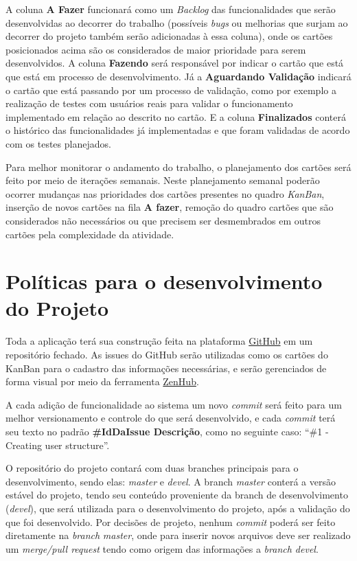 A coluna \textbf{A Fazer} funcionará como um \textit{Backlog} das funcionalidades que serão desenvolvidas ao decorrer do trabalho (possíveis \textit{bugs} ou melhorias que surjam ao decorrer do projeto também serão adicionadas à essa coluna), onde os cartões posicionados acima são os considerados de maior prioridade para serem desenvolvidos. A coluna \textbf{Fazendo} será responsável por indicar o cartão que está que está em processo de desenvolvimento. Já a \textbf{Aguardando Validação} indicará o cartão que está passando por um processo de validação, como por exemplo a realização de testes com usuários reais para validar o funcionamento implementado em relação ao descrito no cartão. E a coluna \textbf{Finalizados} conterá o histórico das funcionalidades já implementadas e que foram validadas de acordo com os testes planejados.

Para melhor monitorar o andamento do trabalho, o planejamento dos cartões será feito por meio de iterações semanais. Neste planejamento semanal poderão ocorrer mudanças nas prioridades dos cartões presentes no quadro \textit{KanBan}, inserção de novos cartões na fila \textbf{A fazer}, remoção do quadro cartões que são considerados não necessários ou que precisem ser desmembrados em outros cartões pela complexidade da atividade. 

\section{Políticas para o desenvolvimento do Projeto}

Toda a aplicação terá sua construção feita na plataforma \href{https://github.com/}{GitHub}
em um repositório fechado. As issues do GitHub serão utilizadas como os cartões do KanBan para o cadastro das informações necessárias, e serão gerenciados de forma visual por meio da ferramenta \href{https://www.zenhub.com/}{ZenHub}.
 
A cada adição de funcionalidade ao sistema um novo \textit{commit} será feito para um melhor versionamento e controle do que será desenvolvido, e cada \textit{commit} terá seu texto no padrão \textbf{\#IdDaIssue Descrição}, como no seguinte caso:  “\#1 - Creating user structure”.

O repositório do projeto contará com duas branches principais para o desenvolvimento, sendo elas: \textit{master} e \textit{devel}. A branch \textit{master} conterá a versão estável do projeto, tendo seu conteúdo proveniente da branch de desenvolvimento (\textit{devel}), que será utilizada para o desenvolvimento do projeto, após a validação do que foi desenvolvido. Por decisões de projeto, nenhum \textit{commit} poderá ser feito diretamente na \textit{branch} \textit{master}, onde para inserir novos arquivos deve ser realizado um \textit{merge/pull request} tendo como origem das informações a \textit{branch devel}.
